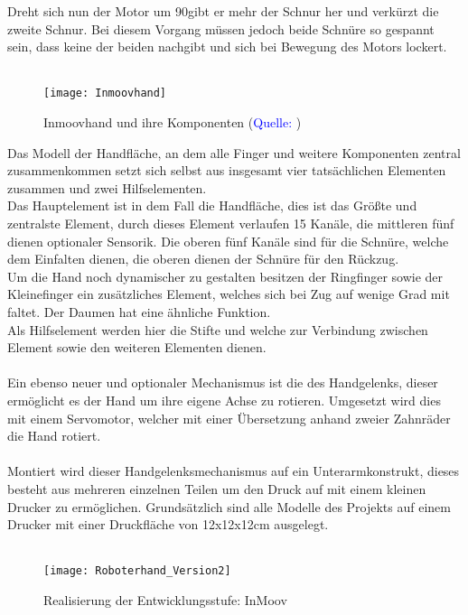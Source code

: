 \documentclass[titlepage,12pt,twoside]{article}
\begin{document}
Dreht sich nun der Motor um 90\textdegree gibt er mehr der Schnur her und verkürzt die zweite Schnur. Bei diesem Vorgang müssen jedoch beide Schnüre so gespannt sein, dass keine der beiden nachgibt und sich bei Bewegung des Motors lockert. \\
\\
\begin{figure}[H]
	\begin{center}
		\scalebox{0.8}
		{\texttt{[image: Inmoovhand]}}
		\caption{Inmoovhand und ihre Komponenten (\textcolor{blue}{Quelle: \cite{Inmoovhand}})}
		\label{fig:Inmoovhand}			
	\end{center}
\end{figure}
\hfill \break
Das Modell der Handfläche, an dem alle Finger und weitere Komponenten zentral zusammenkommen setzt sich selbst aus insgesamt vier tatsächlichen Elementen zusammen und zwei Hilfselementen. \\
Das Hauptelement ist in dem Fall die Handfläche, dies ist das Größte und zentralste Element, durch dieses Element verlaufen 15 Kanäle, die mittleren fünf dienen optionaler Sensorik. Die oberen fünf Kanäle sind für die Schnüre, 
welche dem Einfalten dienen, die oberen dienen der Schnüre für den Rückzug. \\
Um die Hand noch dynamischer zu gestalten besitzen der Ringfinger sowie der Kleinefinger ein zusätzliches Element, welches sich bei Zug auf wenige Grad mit faltet. Der Daumen hat eine ähnliche Funktion. \\
Als Hilfselement werden hier die Stifte und welche zur Verbindung zwischen Element sowie den weiteren Elementen dienen. \\
\\
Ein ebenso neuer und optionaler Mechanismus ist die des Handgelenks, dieser ermöglicht es der Hand um ihre eigene Achse zu rotieren. Umgesetzt wird dies mit einem Servomotor, welcher mit einer Übersetzung anhand zweier Zahnräder die Hand rotiert. \\
\\
Montiert wird dieser Handgelenksmechanismus auf ein Unterarmkonstrukt, dieses besteht aus mehreren einzelnen Teilen um den Druck auf mit einem kleinen Drucker zu ermöglichen. Grundsätzlich sind alle Modelle des Projekts  auf einem Drucker 
mit einer Druckfläche von 12x12x12cm ausgelegt. \\
\\
\begin{figure}[H]
	\begin{center}
		\scalebox{1.2}
		{\texttt{[image: Roboterhand\_Version2]}}
		\caption{Realisierung der Entwicklungsstufe: InMoov}
		\label{fig:Roboterhand_Version2}			
	\end{center}
\end{figure}
\end{document}
